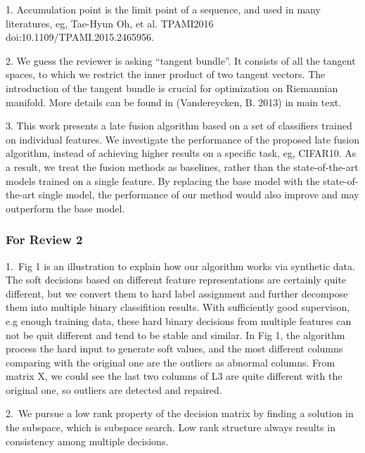 \documentclass[letterpaper]{article}
\begin{document}
1. Accumulation point is the limit point of a sequence, and used in many literatures, eg, Tae-Hyun Oh, et al. TPAMI2016 doi:10.1109/TPAMI.2015.2465956.

2. We guess the reviewer is asking “tangent bundle”.
It consists of all the tangent spaces, to which we restrict the inner product of two tangent vectors.
The introduction of the tangent bundle is crucial for optimization on Riemannian manifold.
More details can be found in (Vandereycken, B. 2013) in main text.

3. This work presents a late fusion algorithm based on a set of classifiers trained on individual features.
We investigate the performance of the proposed late fusion algorithm, instead of achieving higher results on a specific task, eg, CIFAR10.
As a result, we treat the fusion methods as baselines, rather than the state-of-the-art models trained on a single feature.
By replacing the base model with the state-of-the-art single model,
the performance of our method would also improve and may outperform the base model.

\iffalse
\subsubsection{For Review 2}

1.~Fig 1 is an illustration to explain how our algorithm works via synthetic data.
The soft decisions based on different feature representations are certainly quite different,
but we convert them to hard label assignment and further decompose them into multiple binary classifition results.
With sufficiently good supervison, e.g enough training data,
these hard binary decisions from multiple features can not be quit different and tend to be stable and similar.
In Fig 1, the algorithm process the hard input to generate soft values,
and the most different columns comparing with the original one are the outliers as abnormal columns.
From matrix X, we could see the last two columns of L3 are quite different with the original one,
so outliers are detected and repaired.

2.~We pursue a low rank property of the decision matrix by finding a solution in the subspace, which is subspace search.
Low rank structure always results in consistency among multiple decisions.
\end{document}
